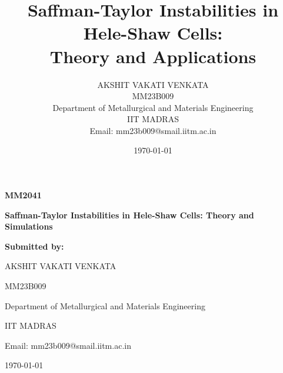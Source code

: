 \documentclass[12pt,a4paper]{article}
\title{Saffman-Taylor Instabilities in Hele-Shaw Cells:\\ Theory and Applications}
\author{AKSHIT VAKATI VENKATA\\
        \normalsize{MM23B009}\\
        \normalsize{Department of Metallurgical and Materials Engineering}\\
        \normalsize{IIT MADRAS}\\
        \normalsize{Email: mm23b009@smail.iitm.ac.in}
       }
\date{\today}
\begin{document}
\begin{titlepage}
\begin{center}
\vspace*{2cm}
{\Huge\bfseries MM2041\par}
\vspace{2cm}
{\Huge\bfseries Saffman-Taylor Instabilities in Hele-Shaw Cells: Theory and Simulations\par}
\vspace{3cm}
{\Large\bfseries Submitted by:\par}
\vspace{1cm}
{\Large AKSHIT VAKATI VENKATA\par}
\vspace{0.3cm}
{\large MM23B009\par}
\vspace{0.3cm}
{\large Department of Metallurgical and Materials Engineering\par}
\vspace{0.3cm}
{\large IIT MADRAS\par}
\vspace{0.3cm}
{\large Email: mm23b009@smail.iitm.ac.in\par}
\vfill
{\large \today\par}
\end{center}
\end{titlepage}

\tableofcontents
\listoffigures 
\newpage
\end{document}
